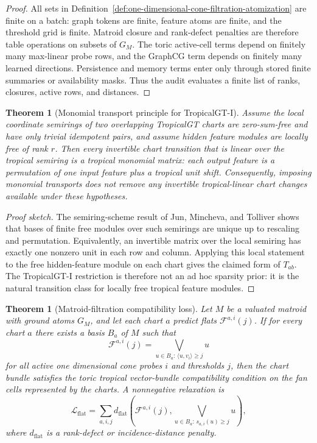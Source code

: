 \documentclass[11pt]{article}
\newtheorem{theorem}[definition]{Theorem}
\begin{document}
\begin{proof}
All sets in Definition~\ref{def:one-dimensional-cone-filtration-atomization} are finite on a batch: graph tokens are finite, feature atoms are finite, and the threshold grid is finite.  Matroid closure and rank-defect penalties are therefore table operations on subsets of $G_M$.  The toric active-cell terms depend on finitely many max-linear probe rows, and the GraphCG term depends on finitely many learned directions.  Persistence and memory terms enter only through stored finite summaries or availability masks.  Thus the audit evaluates a finite list of ranks, closures, active rows, and distances.
\end{proof}

\begin{theorem}[Monomial transport principle for TropicalGT-I]
\label{thm:monomial-transport-principle}
Assume the local coordinate semirings of two overlapping TropicalGT charts are zero-sum-free and have only trivial idempotent pairs, and assume hidden feature modules are locally free of rank $r$.  Then every invertible chart transition that is linear over the tropical semiring is a tropical monomial matrix: each output feature is a permutation of one input feature plus a tropical unit shift.  Consequently, imposing monomial transports does not remove any invertible tropical-linear chart changes available under these hypotheses.
\end{theorem}

\begin{proof}[Proof sketch]
The semiring-scheme result of Jun, Mincheva, and Tolliver shows that bases of finite free modules over such semirings are unique up to rescaling and permutation.  Equivalently, an invertible matrix over the local semiring has exactly one nonzero unit in each row and column.  Applying this local statement to the free hidden-feature module on each chart gives the claimed form of $T_{ab}$.  The TropicalGT-I restriction is therefore not an ad hoc sparsity prior: it is the natural transition class for locally free tropical feature modules.\end{proof}

\begin{theorem}[Matroid-filtration compatibility loss]
\label{thm:matroid-filtration-compatibility}
Let $M$ be a valuated matroid with ground atoms $G_M$, and let each chart $a$ predict flats $\mathcal{F}^{a,i}(j)$.  If for every chart $a$ there exists a basis $B_a$ of $M$ such that
\[
  \mathcal{F}^{a,i}(j)=\bigvee_{u\in B_a:\,\langle u,v_i\rangle\ge j} u
\]
for all active one dimensional cone probes $i$ and thresholds $j$, then the chart bundle satisfies the toric tropical vector-bundle compatibility condition on the fan cells represented by the charts.  A nonnegative relaxation is
\[
  \mathcal{L}_{\mathrm{flat}} = \sum_{a,i,j} d_{\mathrm{flat}}\left(\mathcal{F}^{a,i}(j),\bigvee_{u\in B_a:\,s_{a,i}(u)\ge j}u\right),
\]
where $d_{\mathrm{flat}}$ is a rank-defect or incidence-distance penalty.
\end{theorem}
\end{document}
